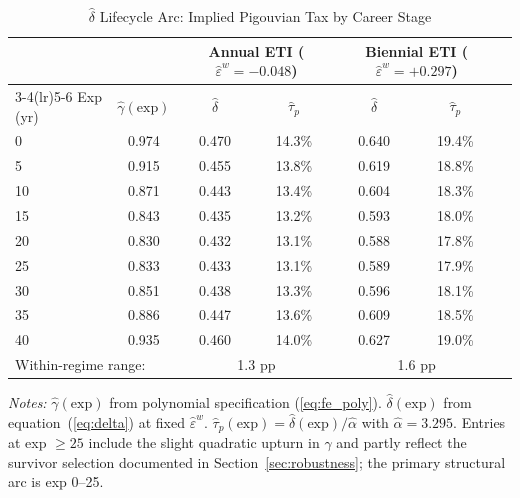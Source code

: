 \documentclass[12pt]{article}
\theoremstyle{definition}
\theoremstyle{remark}
\begin{document}
\begin{table}[htbp]
\centering
\caption{$\hat{\delta}$ Lifecycle Arc: Implied Pigouvian Tax by Career Stage}
\label{tab:delta_arc}
\begin{threeparttable}
\small
\setlength{\tabcolsep}{6pt}
\begin{tabular}{lcccccc}
\toprule
 & & \multicolumn{2}{c}{Annual ETI ($\hat{\varepsilon}^w = -0.048$)} & \multicolumn{2}{c}{Biennial ETI ($\hat{\varepsilon}^w = +0.297$)} \\
\cmidrule(lr){3-4}\cmidrule(lr){5-6}
Exp (yr) & $\hat{\gamma}(\text{exp})$ & $\hat{\delta}$ & $\hat{\tau}_p$ & $\hat{\delta}$ & $\hat{\tau}_p$ \\
\midrule
0  & 0.974 & 0.470 & 14.3\% & 0.640 & 19.4\% \\
5  & 0.915 & 0.455 & 13.8\% & 0.619 & 18.8\% \\
10 & 0.871 & 0.443 & 13.4\% & 0.604 & 18.3\% \\
15 & 0.843 & 0.435 & 13.2\% & 0.593 & 18.0\% \\
20 & 0.830 & 0.432 & 13.1\% & 0.588 & 17.8\% \\
25 & 0.833 & 0.433 & 13.1\% & 0.589 & 17.9\% \\
30 & 0.851 & 0.438 & 13.3\% & 0.596 & 18.1\% \\
35 & 0.886 & 0.447 & 13.6\% & 0.609 & 18.5\% \\
40 & 0.935 & 0.460 & 14.0\% & 0.627 & 19.0\% \\
\midrule
\multicolumn{2}{l}{Within-regime range:} & \multicolumn{2}{c}{1.3 pp} & \multicolumn{2}{c}{1.6 pp} \\
\bottomrule
\end{tabular}
\begin{tablenotes}
\small
\item \textit{Notes:} $\hat{\gamma}(\text{exp})$ from polynomial specification
(\ref{eq:fe_poly}). $\hat{\delta}(\text{exp})$ from equation~(\ref{eq:delta}) at fixed
$\hat{\varepsilon}^w$. $\hat{\tau}_p(\text{exp}) = \hat{\delta}(\text{exp})/\hat{\alpha}$
with $\hat{\alpha} = 3.295$. Entries at exp $\geq 25$ include the slight quadratic upturn in
$\hat{\gamma}$ and partly reflect the survivor selection documented in
Section~\ref{sec:robustness}; the primary structural arc is exp 0--25.
\end{tablenotes}
\end{threeparttable}
\end{table}
\end{document}

